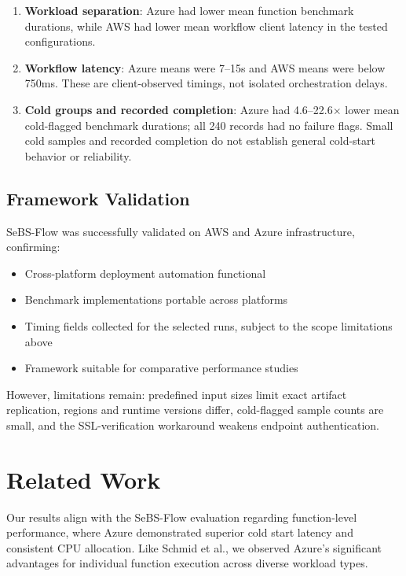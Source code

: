 \documentclass[sigconf,nonacm]{acmart}
\begin{document}
\begin{enumerate}
    \item \textbf{Workload separation}: Azure had lower mean function benchmark durations, while AWS had lower mean workflow client latency in the tested configurations.
    \item \textbf{Workflow latency}: Azure means were 7--15s and AWS means were below 750ms. These are client-observed timings, not isolated orchestration delays.
    \item \textbf{Cold groups and recorded completion}: Azure had 4.6--22.6$\times$ lower mean cold-flagged benchmark durations; all 240 records had no failure flags. Small cold samples and recorded completion do not establish general cold-start behavior or reliability.
\end{enumerate}

\subsection{Framework Validation}

SeBS-Flow was successfully validated on AWS and Azure infrastructure, confirming:
\begin{itemize}
    \item Cross-platform deployment automation functional
    \item Benchmark implementations portable across platforms
    \item Timing fields collected for the selected runs, subject to the scope limitations above
    \item Framework suitable for comparative performance studies
\end{itemize}

However, limitations remain: predefined input sizes limit exact artifact replication, regions and runtime versions differ, cold-flagged sample counts are small, and the SSL-verification workaround weakens endpoint authentication.


\section{Related Work}

Our results align with the SeBS-Flow evaluation \cite{sebsflow} regarding function-level performance, where Azure demonstrated superior cold start latency and consistent CPU allocation. Like Schmid et al., we observed Azure's significant advantages for individual function execution across diverse workload types.
\end{document}
